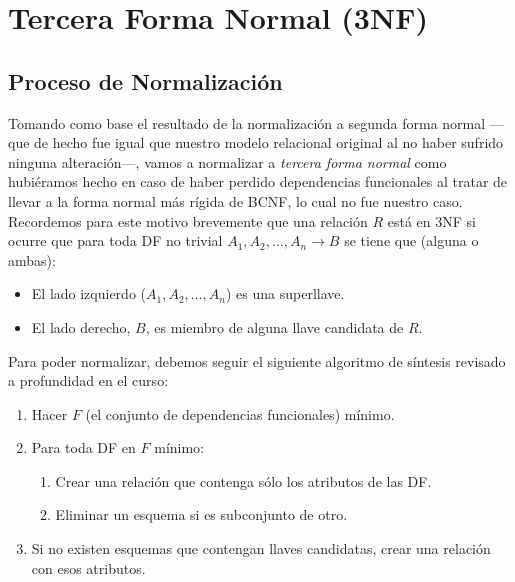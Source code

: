 \documentclass[11pt,letterpaper]{article}
\begin{document}
\section{Tercera Forma Normal (3NF)}

\subsection{Proceso de Normalización}
Tomando como base el resultado de la normalización a segunda forma normal ---que de hecho fue igual que nuestro modelo relacional original al no haber sufrido ninguna alteración---, vamos a normalizar a \textit{tercera forma normal} como hubiéramos hecho en caso de haber perdido dependencias funcionales al tratar de llevar a la forma normal más rígida de BCNF, lo cual no fue nuestro caso.\\

Recordemos para este motivo brevemente que una relación $R$ está en 3NF si ocurre que para toda DF no trivial $A_1,A_2,\dots, A_n\rightarrow B$ se tiene que (alguna o ambas):

\begin{itemize}
\item El lado izquierdo ($A_1,A_2,\dots, A_n$) es una superllave.
\item El lado derecho, $B$, es miembro de alguna llave candidata de $R$.
\end{itemize}

Para poder normalizar, debemos seguir el siguiente algoritmo de síntesis revisado a profundidad en el curso:

\begin{enumerate}
\item Hacer $F$ (el conjunto de dependencias funcionales) mínimo.
\item Para toda DF en $F$ mínimo:
\begin{enumerate}
\item Crear una relación que contenga sólo los atributos de las DF.
\item Eliminar un esquema si es subconjunto de otro.
\end{enumerate}
\item Si no existen esquemas que contengan llaves candidatas, crear una relación con esos atributos.
\end{enumerate}
\end{document}

